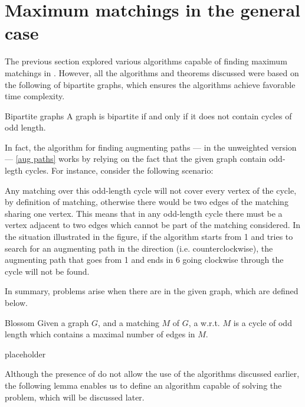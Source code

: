 \documentclass[a4paper, 12pt]{report}
\begin{document}
    \section{Maximum matchings in the general case}

    The previous section explored various algorithms capable of finding maximum matchings in . However, all the algorithms and theorems discussed were based on the following  of bipartite graphs, which ensures the algorithms achieve favorable time complexity.

    \begin{framedthm}{Bipartite graphs}
        A graph is bipartite if and only if it does not contain cycles of odd length.
    \end{framedthm}

    In fact, the algorithm for finding augmenting paths --- in the unweighted version --- \cref{aug paths} works by relying on the fact that the given graph  contain odd-legth cycles. For instance, consider the following scenario:


    Any matching over this odd-length cycle will not cover every vertex of the cycle, by definition of matching, otherwise there would be two edges of the matching sharing one vertex. This means that in any odd-length cycle there must be a vertex adjacent to two edges which cannot be part of the matching considered. In the situation illustrated in the figure, if the algorithm starts from 1 and tries to search for an augmenting path in the  direction (i.e. counterclockwise), the augmenting path that goes from 1 and ends in 6 going clockwise through the cycle will not be found.

    In summary, problems arise when there are  in the given graph, which are defined below.

    \begin{frameddefn}[label={blossom}]{Blossom}
        Given a graph $G$, and a matching $M$ of $G$, a  w.r.t. $M$ is a cycle of odd length which contains a maximal number of edges in $M$.
    \end{frameddefn}

    \begin{example}[Blossoms]
        placeholder 
    \end{example}

    Although the presence of  do not allow the use of the algorithms discussed earlier, the following lemma enables us to define an algorithm capable of solving the problem, which will be discussed later.
\end{document}
